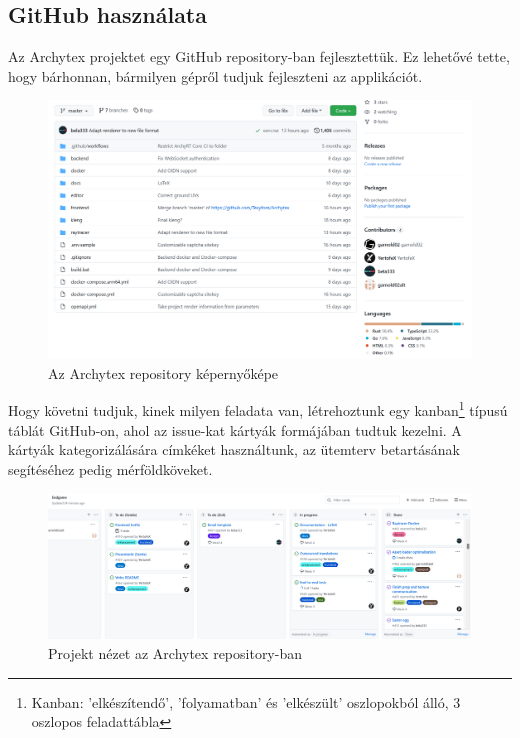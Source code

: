 \subsection{GitHub használata}
Az Archytex projektet egy GitHub repository-ban fejlesztettük. Ez lehetővé tette, hogy bárhonnan, bármilyen gépről tudjuk fejleszteni az applikációt.

\begin{figure}[h]
  \centering
  \includegraphics[width=.9\textwidth]{parts/developer-documentation/work/images/repository.png}
  \caption{Az Archytex repository képernyőképe}
\end{figure}

Hogy követni tudjuk, kinek milyen feladata van, létrehoztunk egy kanban\footnote{Kanban: 'elkészítendő', 'folyamatban' és 'elkészült' oszlopokból álló, 3 oszlopos feladattábla} típusú táblát GitHub-on, ahol az issue-kat kártyák formájában tudtuk kezelni. A kártyák kategorizálására címkéket használtunk, az ütemterv betartásának segítéséhez pedig mérföldköveket.

\begin{figure}[h]
  \centering
  \includegraphics[width=.9\textwidth]{parts/developer-documentation/work/images/github-project.png}
  \caption{Projekt nézet az Archytex repository-ban}
\end{figure}